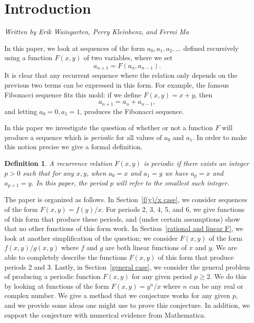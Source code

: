 \documentclass[12pt]{article}
\newtheorem{definition}{Definition}
\begin{document}
\maketitle

\section{Introduction}
\emph{Written by Erik Waingarten, Perry Kleinhenz, and Fermi Ma}

In this paper, we look at sequences of the form $a_0, a_1, a_2, \dots$ defined recursively using a function $F(x,y)$ of two variables, where we set
\begin{equation*}
a_{n+1} = F(a_n, a_{n-1}).
\end{equation*}
It is clear that any recurrent sequence where the relation only depends on the previous two terms can be expressed in this form. For example, the famous Fibonacci sequence fits this mold: if we define $F(x,y) = x + y$, then 
\begin{equation*}
a_{n+1} = a_n + a_{n-1},
\end{equation*}
and letting $a_0 =0 , a_1 = 1$, produces the Fibonacci sequence. 

In this paper we investigate the question of whether or not a function $F$ will produce a sequence which is \emph{periodic} for all values of $a_0$ and $a_1$. In order to make this notion precise we give a formal definition.
\begin{definition}
A recurrence relation $F(x,y)$ is \textit{periodic} if there exists an integer $p>0$ such that for any $x,y$, when $a_0 = x$ and $a_1 = y$ we have $a_p = x$ and $a_{p+1} = y$. In this paper, the period $p$ will refer to the smallest such integer.
\end{definition}

The paper is organized as follows. In Section~\ref{f(y)/x case}, we consider sequences of the form $F(x,y) = f(y)/x$. For periods 2, 3, 4, 5, and 6, we give functions of this form that produce these periods, and (under certain assumptions) show that no other functions of this form work. In Section~\ref{rational and linear F}, we look at another simplification of the question; we consider $F(x,y)$ of the form $f(x,y)/g(x,y)$ where $f$ and $g$ are both linear functions of $x$ and $y$. We are able to completely describe the functions $F(x,y)$ of this form that produce periods 2 and 3. Lastly, in Section~\ref{general case}, we consider the general problem of producing a periodic function $F(x,y)$ for any given period $p \geq 2$. We do this by looking at functions of the form $F(x,y) = y^n/x$ where $n$ can be any real or complex number. We give a method that we conjecture works for any given $p$, and we provide some ideas one might use to prove this conjecture. In addition, we support the conjecture with numerical evidence from Mathematica.
\end{document}
